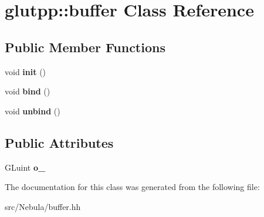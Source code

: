 \hypertarget{classglutpp_1_1buffer}{\section{glutpp\-:\-:buffer Class Reference}
\label{classglutpp_1_1buffer}
}
\subsection*{Public Member Functions}
\begin{DoxyCompactItemize}
\item 
\hypertarget{classglutpp_1_1buffer_a557629990348485f76e992293cfdb636}{void {\bfseries init} ()}\label{classglutpp_1_1buffer_a557629990348485f76e992293cfdb636}

\item 
\hypertarget{classglutpp_1_1buffer_a37d4b5aac0052a9724b94784205945e7}{void {\bfseries bind} ()}\label{classglutpp_1_1buffer_a37d4b5aac0052a9724b94784205945e7}

\item 
\hypertarget{classglutpp_1_1buffer_af93df84319c7d459b77c4c0c5e515119}{void {\bfseries unbind} ()}\label{classglutpp_1_1buffer_af93df84319c7d459b77c4c0c5e515119}

\end{DoxyCompactItemize}
\subsection*{Public Attributes}
\begin{DoxyCompactItemize}
\item 
\hypertarget{classglutpp_1_1buffer_a45bc4e78c108b155f79e81901b7faba1}{G\-Luint {\bfseries o\-\_\-}}\label{classglutpp_1_1buffer_a45bc4e78c108b155f79e81901b7faba1}

\end{DoxyCompactItemize}


The documentation for this class was generated from the following file\-:\begin{DoxyCompactItemize}
\item 
src/\-Nebula/buffer.\-hh\end{DoxyCompactItemize}
